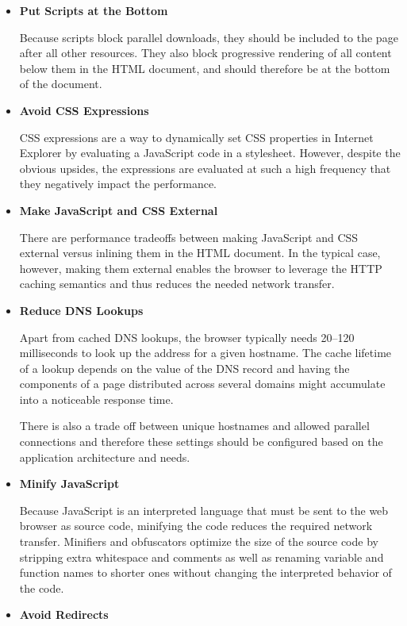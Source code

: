 \begin{itemize}
\item \textbf{Put Scripts at the Bottom}

  Because scripts block parallel downloads, they should be included to
  the page after all other resources. They also block progressive
  rendering of all content below them in the HTML document, and should
  therefore be at the bottom of the document.

\item \textbf{Avoid CSS Expressions}

  CSS expressions are a way to dynamically set CSS properties in
  Internet Explorer by evaluating a JavaScript code in a
  stylesheet. However, despite the obvious upsides, the expressions
  are evaluated at such a high frequency that they negatively impact
  the performance.

\item \textbf{Make JavaScript and CSS External}

  There are performance tradeoffs between making JavaScript and CSS
  external versus inlining them in the HTML document. In the typical
  case, however, making them external enables the browser to leverage
  the HTTP caching semantics and thus reduces the needed network
  transfer.

\item \textbf{Reduce DNS Lookups}

  Apart from cached DNS lookups, the browser typically needs 20--120
  milliseconds to look up the  address for a given
  hostname. The cache lifetime of a lookup depends on the 
  value of the DNS record and having the components of a page
  distributed across several domains might accumulate into a
  noticeable response time.

  There is also a trade off between unique hostnames and allowed
  parallel connections and therefore these settings should be
  configured based on the application architecture and needs.

\item \textbf{Minify JavaScript}

  Because JavaScript is an interpreted language that must be sent to
  the web browser as source code, minifying the code reduces the
  required network transfer. Minifiers and obfuscators optimize the
  size of the source code by stripping extra whitespace and comments
  as well as renaming variable and function names to shorter ones
  without changing the interpreted behavior of the code.

\item \textbf{Avoid Redirects}


\end{itemize}

